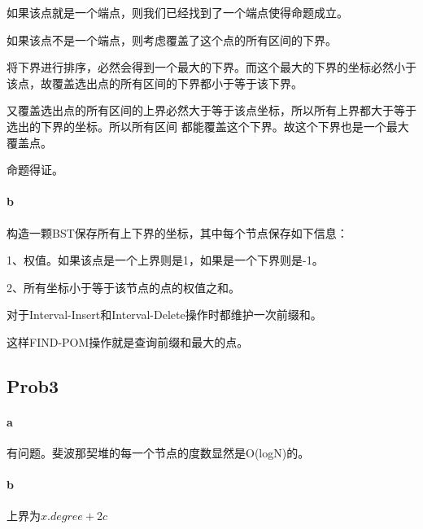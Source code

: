 \documentclass{ctexart}
\begin{document}
如果该点就是一个端点，则我们已经找到了一个端点使得命题成立。

如果该点不是一个端点，则考虑覆盖了这个点的所有区间的下界。

将下界进行排序，必然会得到一个最大的下界。而这个最大的下界的坐标必然小于该点，故覆盖选出点的所有区间的下界都小于等于该下界。

又覆盖选出点的所有区间的上界必然大于等于该点坐标，所以所有上界都大于等于选出的下界的坐标。所以所有区间
都能覆盖这个下界。故这个下界也是一个最大覆盖点。

命题得证。
\paragraph{b} 构造一颗BST保存所有上下界的坐标，其中每个节点保存如下信息：

1、权值。如果该点是一个上界则是1，如果是一个下界则是-1。

2、所有坐标小于等于该节点的点的权值之和。

对于Interval-Insert和Interval-Delete操作时都维护一次前缀和。

这样FIND-POM操作就是查询前缀和最大的点。

\subsection{Prob3}
\paragraph{a} 有问题。斐波那契堆的每一个节点的度数显然是O(logN)的。
\paragraph{b} 上界为$x.degree+2c$
\end{document}
